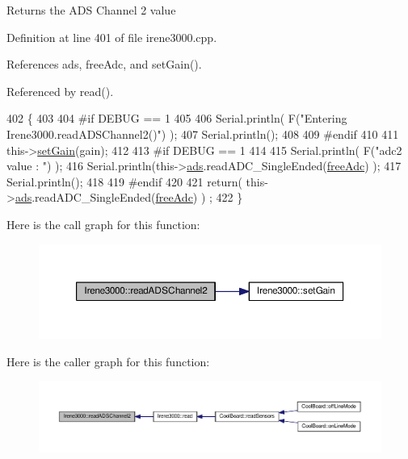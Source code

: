 \begin{DoxyReturn}{Returns}
the A\+DS Channel 2 value 
\end{DoxyReturn}


Definition at line 401 of file irene3000.\+cpp.



References ads, free\+Adc, and set\+Gain().



Referenced by read().


\begin{DoxyCode}
402 \{   
403 
404 \textcolor{preprocessor}{#if DEBUG == 1 }
405     
406     Serial.println( F(\textcolor{stringliteral}{"Entering Irene3000.readADSChannel2()"}) );
407     Serial.println();
408 
409 \textcolor{preprocessor}{#endif}
410 
411     this->\hyperlink{classIrene3000_aff7c5da186b388e7272e63ff88a20c34}{setGain}(gain);
412 
413 \textcolor{preprocessor}{#if DEBUG == 1 }
414     
415     Serial.println( F(\textcolor{stringliteral}{"adc2 value : "}) );
416     Serial.println(this->\hyperlink{classIrene3000_a1215e77ba761c9908d80d691f149e135}{ads}.readADC\_SingleEnded(\hyperlink{Irene3000_8h_a55497513af255250e464ed76543d46d7}{freeAdc}) );
417     Serial.println();
418 
419 \textcolor{preprocessor}{#endif}
420 
421     \textcolor{keywordflow}{return}( this->\hyperlink{classIrene3000_a1215e77ba761c9908d80d691f149e135}{ads}.readADC\_SingleEnded(\hyperlink{Irene3000_8h_a55497513af255250e464ed76543d46d7}{freeAdc}) ) ;
422 \}
\end{DoxyCode}
Here is the call graph for this function\+:
\nopagebreak
\begin{figure}[H]
\begin{center}
\leavevmode
\includegraphics[width=350pt]{classIrene3000_ae73bd2ed14a199a7e83f4d6458476a7c_cgraph}
\end{center}
\end{figure}
Here is the caller graph for this function\+:
\nopagebreak
\begin{figure}[H]
\begin{center}
\leavevmode
\includegraphics[width=350pt]{classIrene3000_ae73bd2ed14a199a7e83f4d6458476a7c_icgraph}
\end{center}
\end{figure}
\mbox{\label{classIrene3000_ae0e0a5b773c3625b44c1d113c76a1540}} 
